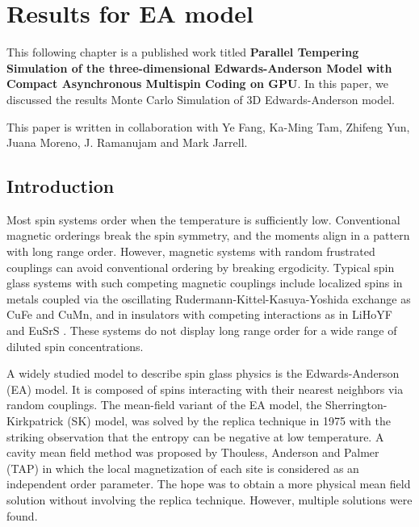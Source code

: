 \chapter{Results for EA model}
\label{chap:sg_result}
This following chapter is a published work titled {\bf Parallel Tempering Simulation of the three-dimensional Edwards-Anderson Model  with  Compact Asynchronous Multispin Coding on GPU}.
In this paper, we discussed the results Monte Carlo
Simulation of 3D Edwards-Anderson model.

This paper is written in collaboration with Ye Fang, Ka-Ming Tam, Zhifeng Yun,
Juana Moreno, J. Ramanujam and Mark Jarrell. %
\section{Introduction} 
Most spin systems order when the temperature is sufficiently low. 
Conventional magnetic orderings break the spin symmetry, and the moments align 
in a pattern with long range order. However, magnetic 
systems with random frustrated couplings can avoid conventional 
ordering by breaking ergodicity. Typical spin glass systems with 
such competing magnetic couplings include localized spins in metals coupled 
via the oscillating Rudermann-Kittel-Kasuya-Yoshida 
exchange as CuFe and CuMn, and in insulators with competing interactions 
as in LiHoYF and EuSrS \cite{Binder-Young-1986,Mydosh-1993,Diep-2004}. These 
systems do not display long range order for a wide range of diluted spin 
concentrations.

A widely studied model to describe spin glass physics is the Edwards-Anderson 
(EA) model\cite{Edwards-Anderson-1975}. It is composed of spins interacting
with their nearest neighbors via random couplings. The mean-field variant of the 
EA model, the Sherrington-Kirkpatrick (SK) model\cite{Sherrington-Kirkpatrick1978,Sherrington-Kirkpatrick-1975},
was solved by the replica technique in 1975 with the striking observation that 
the entropy can be negative at low temperature\cite{Sherrington-Kirkpatrick-1975,Sherrington-Kirkpatrick1978}. 
A cavity mean field method was proposed by Thouless, Anderson 
and Palmer (TAP) in which the local magnetization of each site is considered as 
an independent order parameter\cite{Thouless-Anderson-Palmer-1977}. The hope was to 
obtain a more physical mean field solution without involving the replica technique. 
However, multiple solutions were found\cite{Bray-Moore-1980}.

